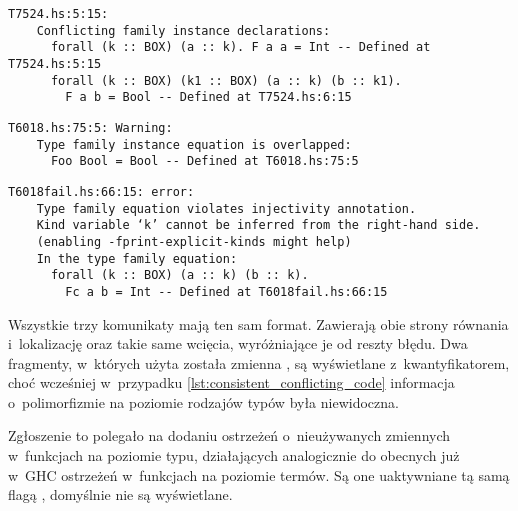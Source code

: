 \begin{lstlisting}[float,language={},label={lst:consistent_conflicting_after},
                   caption={Błąd generowany przez kompilator w przypadku \ref{lst:consistent_conflicting_code} po wprowadzeniu zmian.}]
T7524.hs:5:15:
    Conflicting family instance declarations:
      forall (k :: BOX) (a :: k). F a a = Int -- Defined at T7524.hs:5:15
      forall (k :: BOX) (k1 :: BOX) (a :: k) (b :: k1).
        F a b = Bool -- Defined at T7524.hs:6:15
\end{lstlisting}

\begin{lstlisting}[float,language={},label={lst:consistent_overlapped_after},
                   caption={Ostrzeżenie generowane przez kompilator w przypadku \ref{lst:consistent_overlapped_code} po wprowadzeniu zmian.}]
T6018.hs:75:5: Warning:
    Type family instance equation is overlapped:
      Foo Bool = Bool -- Defined at T6018.hs:75:5
\end{lstlisting}

\begin{lstlisting}[float,language={},label={lst:consistent_injectivity_after},
                   caption={Błąd generowany przez kompilator w przypadku \ref{lst:consistent_injectivity_code} po wprowadzeniu zmian.}]
T6018fail.hs:66:15: error:
    Type family equation violates injectivity annotation.
    Kind variable ‘k’ cannot be inferred from the right-hand side.
    (enabling -fprint-explicit-kinds might help)
    In the type family equation:
      forall (k :: BOX) (a :: k) (b :: k).
        Fc a b = Int -- Defined at T6018fail.hs:66:15
\end{lstlisting}

Wszystkie trzy komunikaty mają ten sam format. Zawierają obie strony równania
i~lokalizację oraz takie same wcięcia, wyróżniające je od reszty błędu.
Dwa fragmenty, w~których użyta została zmienna , są wyświetlane
z~kwantyfikatorem, choć wcześniej w~przypadku
\ref{lst:consistent_conflicting_code} informacja o~polimorfizmie na poziomie
rodzajów typów była niewidoczna.


\label{sec:zgloszenie_10982}

Zgłoszenie to polegało na dodaniu ostrzeżeń o~nieużywanych zmiennych w~funkcjach
na poziomie typu, działających analogicznie do obecnych już w~GHC ostrzeżeń
w~funkcjach na poziomie termów. Są one uaktywniane tą samą flagą
, domyślnie nie są wyświetlane.

